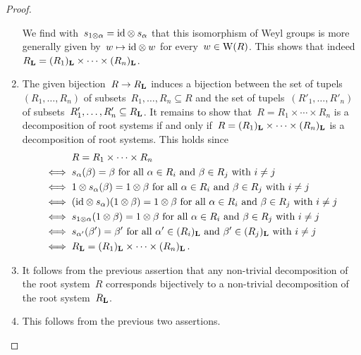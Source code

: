 \begin{proof}
\begin{enumerate}
      We find with~$s_{1 \otimes \alpha} = {\operatorname{id}} \otimes s_\alpha$ that this isomorphism of Weyl groups is more generally given by~$w \mapsto {\operatorname{id}} \otimes w$ for every~$w \in \operatorname{W}(R)$.
      This shows that indeed~$R_{\mathbf{L}} = (R_1)_{\mathbf{L}} \times \dotsb \times (R_n)_{\mathbf{L}}$.
    \item
      The given bijection~$R \to R_{\mathbf{L}}$ induces a bijection between the set of tupels~$(R_1, \dotsc, R_n)$ of subsets~$R_1, \dotsc, R_n \subseteq R$ and the set of tupels~$(R'_1, \dotsc, R'_n)$ of subsets~$R'_1, \dotsc, R'_n \subseteq R_{\mathbf{L}}$.
      It remains to show that~$R = R_1 \times \dotsb \times R_n$ is a decomposition of root systems if and only if~$R = (R_1)_{\mathbf{L}} \times \dotsb \times (R_n)_{\mathbf{L}}$ is a decomposition of root systems.
      This holds since
      \begin{align*}
        {}&
        R = R_1 \times \dotsb \times R_n
        \\
        \iff{}&
        \text{$s_\alpha(\beta) = \beta$ for all~$\alpha \in R_i$ and~$\beta \in R_j$ with~$i \neq j$}
        \\
        \iff{}&
        \text{$1 \otimes s_\alpha(\beta) = 1 \otimes \beta$ for all~$\alpha \in R_i$ and~$\beta \in R_j$ with~$i \neq j$}
        \\
        \iff{}&
        \text{$({\operatorname{id}} \otimes s_\alpha)(1 \otimes \beta) = 1 \otimes \beta$ for all~$\alpha \in R_i$ and~$\beta \in R_j$ with~$i \neq j$}
        \\
        \iff{}&
        \text{$s_{1 \otimes \alpha}(1 \otimes \beta) = 1 \otimes \beta$ for all~$\alpha \in R_i$ and~$\beta \in R_j$ with~$i \neq j$}
        \\
        \iff{}&
        \text{$s_{\alpha'}(\beta') = \beta'$ for all~$\alpha' \in (R_i)_{\mathbf{L}}$ and~$\beta' \in (R_j)_{\mathbf{L}}$ with~$i \neq j$}
        \\
        \iff{}&
        R_{\mathbf{L}} = (R_1)_{\mathbf{L}} \times \dotsb \times (R_n)_{\mathbf{L}} \,.
      \end{align*}
    \item
      It follows from the previous assertion that any non-trivial decomposition of the root system~$R$ corresponds bijectively to a non-trivial decomposition of the root system~$R_{\mathbf{L}}$.
    \item
      This follows from the previous two assertions.
    \qedhere
  \end{enumerate}
\end{proof}


